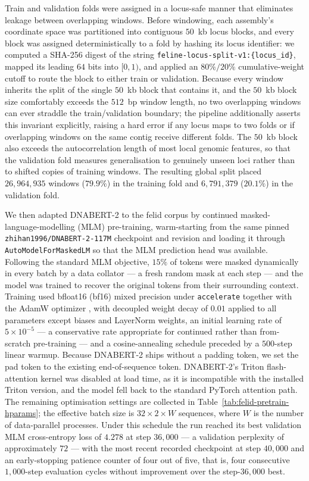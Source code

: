 \documentclass[twocolumn,10pt]{article}
\begin{document}
Train and validation folds were assigned in a locus-safe manner that eliminates leakage between
overlapping windows. Before windowing, each assembly's coordinate space was partitioned into
contiguous $50$~kb locus blocks, and every block was assigned deterministically to a fold by hashing
its locus identifier: we computed a SHA-256 digest of the string
\texttt{feline-locus-split-v1:\{locus\_id\}}, mapped its leading $64$ bits into $[0,1)$, and applied
an $80\%/20\%$ cumulative-weight cutoff to route the block to either train or validation. Because
every window inherits the split of the single $50$~kb block that contains it, and the $50$~kb block
size comfortably exceeds the $512$~bp window length, no two overlapping windows can ever straddle
the train/validation boundary; the pipeline additionally asserts this invariant explicitly, raising
a hard error if any locus maps to two folds or if overlapping windows on the same contig receive
different folds. The $50$~kb block also exceeds the autocorrelation length of most local genomic
features, so that the validation fold measures generalisation to genuinely unseen loci rather than
to shifted copies of training windows. The resulting global split placed $26{,}964{,}935$ windows
($79.9\%$) in the training fold and $6{,}791{,}379$ ($20.1\%$) in the validation fold.

We then adapted DNABERT-2 to the felid corpus by continued masked-language-modelling (MLM)
pre-training, warm-starting from the same pinned \texttt{zhihan1996/DNABERT-2-117M} checkpoint and
revision and loading it through \texttt{AutoModelForMaskedLM} so that the MLM prediction head was
available. Following the standard MLM objective, $15\%$ of tokens were masked dynamically in every
batch by a data collator --- a fresh random mask at each step --- and the model was trained to
recover the original tokens from their surrounding context. Training used bfloat16 (bf16) mixed
precision under \texttt{accelerate} together with the AdamW optimizer \citep{kingma2014adam}, with
decoupled weight decay of $0.01$ applied to all parameters except biases and LayerNorm weights, an
initial learning rate of $5\times10^{-5}$ --- a conservative rate appropriate for continued rather
than from-scratch pre-training --- and a cosine-annealing schedule preceded by a $500$-step linear
warmup. Because DNABERT-2 ships without a padding token, we set the pad token to the existing
end-of-sequence token. DNABERT-2's Triton flash-attention kernel was disabled at load time, as it is
incompatible with the installed Triton version, and the model fell back to the standard PyTorch
attention path. The remaining optimisation settings are collected in
Table~\ref{tab:felid-pretrain-hparams}; the effective batch size is $32\times2\times W$ sequences,
where $W$ is the number of data-parallel processes. Under this schedule the run reached its best
validation MLM cross-entropy loss of $4.278$ at step $36{,}000$ --- a validation perplexity of
approximately $72$ --- with the most recent recorded checkpoint at step $40{,}000$ and an
early-stopping patience counter of four out of five, that is, four consecutive $1{,}000$-step
evaluation cycles without improvement over the step-$36{,}000$ best.
\end{document}
